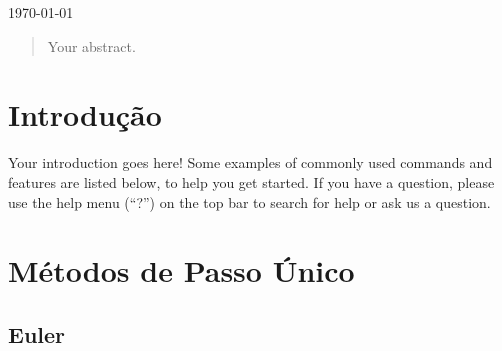 \documentclass[a4paper]{article}
\begin{document}
\begin{titlepage}

{\large \today}\\[3cm] %


 

\vfill %

\end{titlepage}

\tableofcontents

\maketitle



\begin{abstract}
Your abstract.
\end{abstract}

\section{Introdução}

Your introduction goes here! Some examples of commonly used commands and features are listed below, to help you get started. If you have a question, please use the help menu (``?'') on the top bar to search for help or ask us a question.

\section{Métodos de Passo Único}
\label{sec:examples}



\subsection{Euler}
\end{document}
